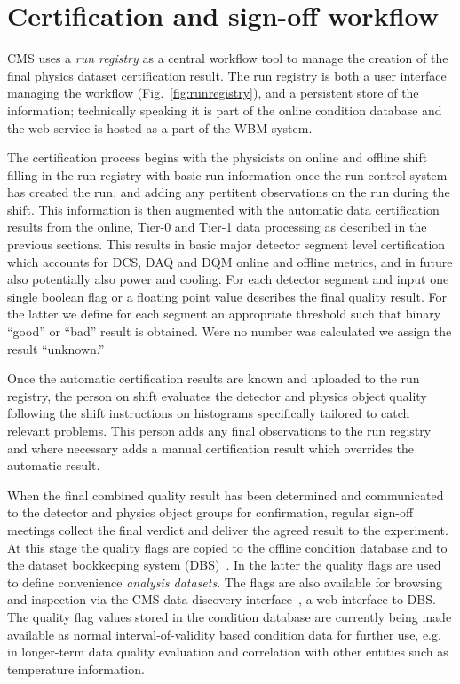 \documentclass[a4paper]{jpconf}
\begin{document}
\section{Certification and sign-off workflow}\label{certification}

CMS uses a {\em run registry} as a central workflow tool to manage the
creation of the final physics dataset certification result.  The run registry
is both a user interface managing the workflow (Fig.~\ref{fig:runregistry}),
and a persistent store of the information; technically speaking it is part of
the online condition database and the web service is hosted as a part of the
WBM system.

The certification process begins with the physicists on online and offline
shift filling in the run registry with basic run information once the run
control system has created the run, and adding any pertitent observations on
the run during the shift.  This information is then augmented with the
automatic data certification results from the online, Tier-0 and Tier-1 data
processing as described in the previous sections.  This results in basic major
detector segment level certification which accounts for DCS, DAQ and DQM
online and offline metrics, and in future also potentially also power and
cooling.  For each detector segment and input one single boolean flag or a
floating point value describes the final quality result.  For the latter we
define for each segment an appropriate threshold such that binary ``good'' or
``bad'' result is obtained.  Were no number was calculated we assign the
result ``unknown.''

Once the automatic certification results are known and uploaded to the run
registry, the person on shift evaluates the detector and physics object
quality following the shift instructions on histograms specifically tailored
to catch relevant problems.  This person adds any final observations to the run
registry and where necessary adds a manual certification result which
overrides the automatic result.

When the final combined quality result has been determined and communicated to
the detector and physics object groups for confirmation, regular sign-off
meetings collect the final verdict and deliver the agreed result to the
experiment.  At this stage the quality flags are copied to the offline
condition database and to the dataset bookkeeping system (DBS)~\cite{dbs}.  In
the latter the quality flags are used to define convenience {\em analysis
  datasets}.  The flags are also available for browsing and inspection via the
CMS data discovery interface~\cite{dbs_discovery}, a web interface to DBS.
The quality flag values stored in the condition database are currently being
made available as normal interval-of-validity based condition data for further
use, e.g. in longer-term data quality evaluation and correlation with other
entities such as temperature information.
\end{document}
